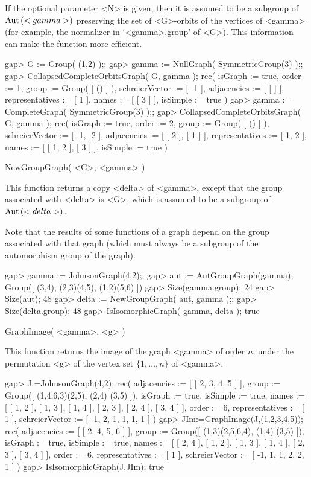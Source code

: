 If the optional  parameter  <N>  is given, then  it is assumed  to  be  a
subgroup of  ${\rm Aut}\,(<gamma>)$  preserving  the  set of  <G>-orbits  of the
vertices  of  <gamma> (for  example, the normalizer in `<gamma>.group' of
<G>).  This information can make the function more efficient.

\beginexample
gap> G := Group( (1,2) );;
gap> gamma := NullGraph( SymmetricGroup(3) );;
gap> CollapsedCompleteOrbitsGraph( G, gamma );
rec(
  isGraph := true,
  order := 1,
  group := Group( [ () ] ),
  schreierVector := [ -1 ],
  adjacencies := [ [  ] ],
  representatives := [ 1 ],
  names := [ [ 3 ] ],
  isSimple := true )
gap> gamma := CompleteGraph( SymmetricGroup(3) );;
gap> CollapsedCompleteOrbitsGraph( G, gamma );
rec(
  isGraph := true,
  order := 2,
  group := Group( [ () ] ),
  schreierVector := [ -1, -2 ],
  adjacencies := [ [ 2 ], [ 1 ] ],
  representatives := [ 1, 2 ],
  names := [ [ 1, 2 ], [ 3 ] ],
  isSimple := true )
\endexample


\>NewGroupGraph( <G>, <gamma> )

This  function returns a  copy <delta> of <gamma>,  except that the group
associated with  <delta> is <G>,  which  is assumed to be  a subgroup  of
${\rm Aut}\,(<delta>)$.

Note that the results of some functions  of  a graph  depend on the group
associated  with  that graph  (which must always  be  a  subgroup  of the
automorphism group of the graph).

\beginexample
gap> gamma := JohnsonGraph(4,2);;
gap> aut := AutGroupGraph(gamma);
Group([ (3,4), (2,3)(4,5), (1,2)(5,6) ])
gap> Size(gamma.group);
24
gap> Size(aut);
48
gap> delta := NewGroupGraph( aut, gamma );;
gap> Size(delta.group);
48
gap> IsIsomorphicGraph( gamma, delta );
true
\endexample


\>GraphImage( <gamma>, <g> )

This  function returns the image of the graph <gamma> of order $n$,
under the permutation <g> of the vertex set $\{1,\ldots,n\}$ of <gamma>.

\beginexample
gap> J:=JohnsonGraph(4,2);                    
rec( adjacencies := [ [ 2, 3, 4, 5 ] ], group := Group([ (1,4,6,3)(2,5), (2,4)
  (3,5) ]), isGraph := true, isSimple := true, 
  names := [ [ 1, 2 ], [ 1, 3 ], [ 1, 4 ], [ 2, 3 ], [ 2, 4 ], [ 3, 4 ] ], 
  order := 6, representatives := [ 1 ], 
  schreierVector := [ -1, 2, 1, 1, 1, 1 ] )
gap> JIm:=GraphImage(J,(1,2,3,4,5));
rec( adjacencies := [ [ 2, 4, 5, 6 ] ], group := Group([ (1,3)(2,5,6,4), (1,4)
  (3,5) ]), isGraph := true, isSimple := true, 
  names := [ [ 2, 4 ], [ 1, 2 ], [ 1, 3 ], [ 1, 4 ], [ 2, 3 ], [ 3, 4 ] ], 
  order := 6, representatives := [ 1 ], 
  schreierVector := [ -1, 1, 1, 2, 2, 1 ] )
gap> IsIsomorphicGraph(J,JIm);
true
\endexample

